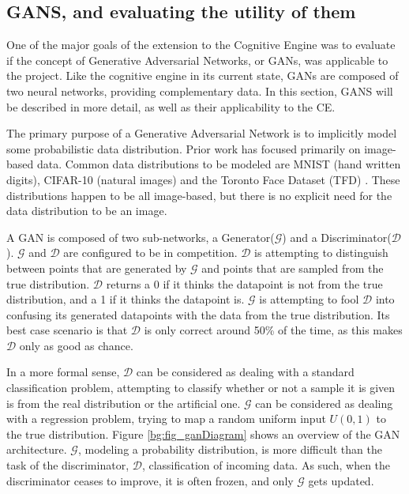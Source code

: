 \documentclass[11pt]{report}
\begin{document}
	\subsection {GANS, and evaluating the utility of them}
	\par One of the major goals of the extension to the Cognitive Engine was to evaluate if the concept of Generative Adversarial Networks, or GANs, was applicable to the project. Like the cognitive engine in its current state, GANs are composed of two neural networks, providing complementary data. In this section, GANS will be described in more detail, as well as their applicability to the CE.  
	\par The primary purpose of a Generative Adversarial Network is to implicitly model some probabilistic data distribution. Prior work has focused primarily on image-based data. Common data distributions to be modeled are MNIST (hand written digits), CIFAR-10 (natural images) and the Toronto Face Dataset (TFD) \cite{gan_overview}. These distributions happen to be all image-based, but there is no explicit need for the data distribution to be an image. 
	\par A GAN is composed of two sub-networks, a Generator($\mathcal{G}$) and a Discriminator($\mathcal{D}$). $\mathcal{G}$ and $\mathcal{D}$ are configured to be in competition. $\mathcal{D}$ is attempting to distinguish between points that are generated by $\mathcal{G}$ and points that are sampled from the true distribution. $\mathcal{D}$ returns a 0 if it thinks the datapoint is not from the true distribution, and a 1 if it thinks the datapoint is. $\mathcal{G}$ is attempting to fool $\mathcal{D}$ into confusing its generated datapoints with the data from the true distribution. Its best case scenario is that $\mathcal{D}$ is only correct around 50\% of the time, as this makes $\mathcal{D}$ only as good as chance.
	\par In a more formal sense, $\mathcal{D}$ can be considered as dealing with a standard classification problem, attempting to classify whether or not a sample it is given is from the real distribution or the artificial one. $\mathcal{G}$ can be considered as dealing with a regression problem, trying to map a random uniform input $U(0,1)$ to the true distribution. Figure \ref{bg:fig_ganDiagram} shows an overview of the GAN architecture. $\mathcal{G}$, modeling a probability distribution, is more difficult than the task of the discriminator, $\mathcal{D}$, classification of incoming data. As such, when the discriminator ceases to improve, it is often frozen, and only $\mathcal{G}$ gets updated. 
\end{document}
